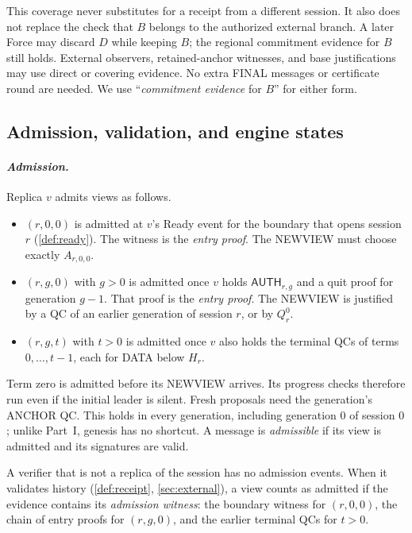 \documentclass[11pt,a4paper]{article}
\newcommand{\tagg}[1]{\ensuremath{\mathsf{#1}}}
\newcommand{\defterm}[1]{\textcolor{rrBlue}{\textit{#1}}}
\begin{document}
This coverage never substitutes for a receipt from a different session.
It also does not replace the check that $B$ belongs to the authorized
external branch. A later Force may discard $D$ while keeping $B$; the
regional commitment evidence for $B$ still holds. External observers,
retained-anchor witnesses, and base justifications may use direct or
covering evidence. No extra FINAL messages or certificate round are
needed. We use ``\defterm{commitment evidence} for $B$'' for either form.

\subsection{Admission, validation, and engine states}
\label{sec:admission}
\paragraph{\defterm{Admission.}}
Replica $v$ admits views as follows.
\begin{itemize}
\item $(r,0,0)$ is admitted at $v$'s Ready event for the boundary that
opens session $r$ (\cref{def:ready}). The witness is the \defterm{entry proof}.
The NEWVIEW must choose exactly $A_{r,0,0}$.
\item $(r,g,0)$ with $g>0$ is admitted once $v$ holds
$\tagg{AUTH}_{r,g}$ and a quit proof for generation $g-1$. That proof is
the \defterm{entry proof}. The NEWVIEW is justified by a QC of an earlier
generation of session $r$, or by $Q_r^0$.
\item $(r,g,t)$ with $t>0$ is admitted once $v$ also holds the terminal
QCs of terms $0,\ldots,t-1$, each for DATA below $H_r$.
\end{itemize}
Term zero is admitted before its NEWVIEW arrives. Its progress checks
therefore run even if the initial leader is silent. Fresh proposals need
the generation's ANCHOR QC. This holds in every generation, including
generation $0$ of session $0$; unlike Part~I, genesis has no shortcut. A
message is \defterm{admissible} if its view is admitted and its signatures
are valid.

A verifier that is not a replica of the session has no
admission events. When it validates history (\cref{def:receipt},
\cref{sec:external}), a view counts as admitted if the evidence contains
its \defterm{admission witness}: the boundary witness for $(r,0,0)$, the chain of
entry proofs for $(r,g,0)$, and the earlier terminal QCs for $t>0$.
\end{document}
